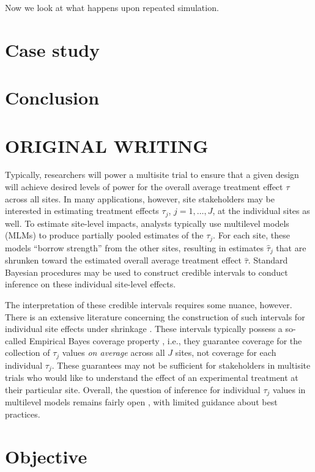 \documentclass[]{article}
\begin{document}
Now we look at what happens upon repeated simulation.

\section{Case study}

\section{Conclusion}



\section{ORIGINAL WRITING}

Typically, researchers will power a multisite trial to ensure that a given design will achieve desired levels of power for the overall average treatment effect $\tau$ across all sites. 
In many applications, however, site stakeholders may be interested in estimating treatment effects $\tau_j$, $j = 1, \ldots, J$, at the individual sites as well.
To estimate site-level impacts, analysts typically use multilevel models (MLMs) to produce partially pooled estimates of the $\tau_j$.
For each site, these models ``borrow strength'' from the other sites, resulting in estimates $\hat{\tau}_j$ that are shrunken toward the estimated overall average treatment effect $\hat{\tau}$.
Standard Bayesian procedures may be used to construct credible intervals to conduct inference on these individual site-level effects.

The interpretation of these credible intervals requires some nuance, however.
There is an extensive literature concerning the construction of such intervals for individual site effects under shrinkage \citep{casella2012shrinkage}.
These intervals typically possess a so-called Empirical Bayes coverage property \citep{morris1983parametric}, i.e., they guarantee coverage for the collection of $\tau_j$ values \textit{on average} across all $J$ sites, not coverage for each individual $\tau_j$.
These guarantees may not be sufficient for stakeholders in multisite trials who would like to understand the effect of an experimental treatment at their particular site.
Overall, the question of inference for individual $\tau_j$ values in multilevel models remains fairly open \citep{armstrong2020robust}, with limited guidance about best practices.

\section{Objective}
\end{document}
